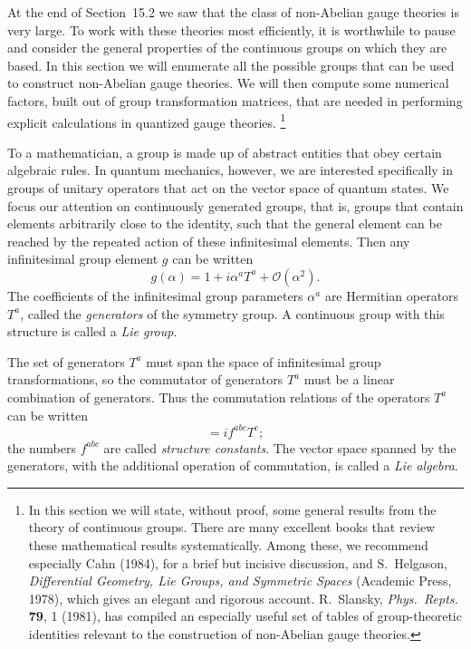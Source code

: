 At the end of Section~15.2 we saw that the class of non-Abelian gauge
theories is very large.  To work with these theories most efficiently, it is
worthwhile to pause and consider the general properties of the continuous
groups on which they are based.  In this section we will enumerate all the
possible groups that can be used to construct non-Abelian gauge theories.  We
will then compute some numerical factors, built out of group transformation
matrices, that are needed in performing explicit calculations in quantized
gauge theories.%
\footnote{In this section we will state, without proof, some general results
from the theory of continuous groups.  There are many excellent books that
review these mathematical results systematically.  Among these, we recommend
especially Cahn (1984), for a brief but incisive discussion, and
S.~Helgason, \emph{Differential Geometry, Lie Groups, and Symmetric Spaces}
(Academic Press, 1978), which gives an elegant and rigorous account.
R.~Slansky, \emph{Phys.\ Repts.} \textbf{79}, 1 (1981), has compiled an
especially useful set of tables of group-theoretic identities relevant to the
construction of non-Abelian gauge theories.}

To a mathematician, a group is made up of abstract entities that obey certain
algebraic rules.  In quantum mechanics, however, we are interested
specifically in groups of unitary operators that act on the vector space of
quantum states.  We focus our attention on continuously generated groups,
that is, groups that contain elements arbitrarily close to the identity, such
that the general element can be reached by the repeated action of these
infinitesimal elements.  Then any infinitesimal group element $g$ can be
written
\begin{equation}
  g(\alpha) = 1 + i\alpha^a T^a + \mathcal{O}(\alpha^2) .
  \label{eq:15.67}
\end{equation}
The coefficients of the infinitesimal group parameters $\alpha^a$ are
Hermitian operators $T^a$, called the \emph{generators} of the symmetry
group.  A continuous group with this structure is called a \emph{Lie group}.

The set of generators $T^a$ must span the space of infinitesimal group
transformations, so the commutator of generators $T^a$ must be a linear
combination of generators.  Thus the commutation relations of the operators
$T^a$ can be written
\begin{equation}
  [T^a, T^b] = if^{abc}T^c ;
  \label{eq:15.68}
\end{equation}
the numbers $f^{abc}$ are called \emph{structure constants}.  The vector
space spanned by the generators, with the additional operation of
commutation, is called a \emph{Lie algebra}.

